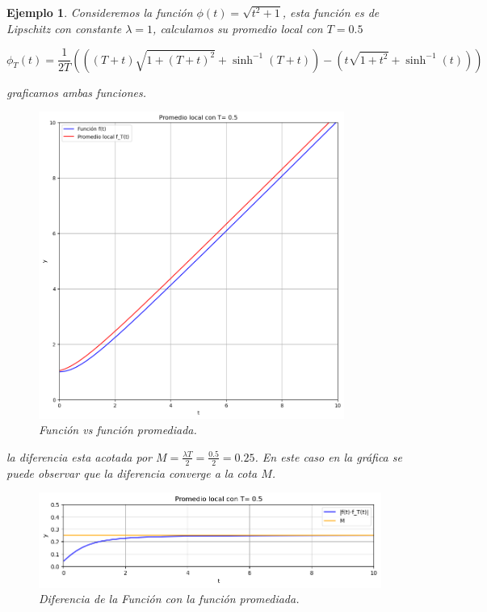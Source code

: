\documentclass[12pt, a4paper]{report}
\newtheorem{example}{Ejemplo}
\begin{document}
\begin{example}
	Consideremos la función $\phi(t)=\sqrt{t^2+1}$, esta función es de Lipschitz
	con constante $\lambda=1$, calculamos su promedio local con $T=0.5$

	$$\phi_T(t)=\frac{1}{2T}(((T + t)\sqrt{1 + (T + t)^2} + \sinh^{-1}(T + t)) - (t\sqrt{1 + t^2} + \sinh^{-1}(t)))$$

	graficamos ambas funciones. 

	\begin{figure}[h]
		\centering
		\includegraphics[width=10cm]{fl.png}
		\caption{Función vs  función promediada.}
	\end{figure}

la diferencia esta acotada por $M=\frac{\lambda T}{2}=\frac{0.5}{2}=0.25$. En este caso en la 
gráfica se puede observar que la diferencia converge a la cota $M$. 

\begin{figure}[h]
	\centering
	\includegraphics[width=13cm]{d.png}
	\caption{Diferencia de la Función con la función promediada.}
\end{figure}

\end{example}
\end{document}
